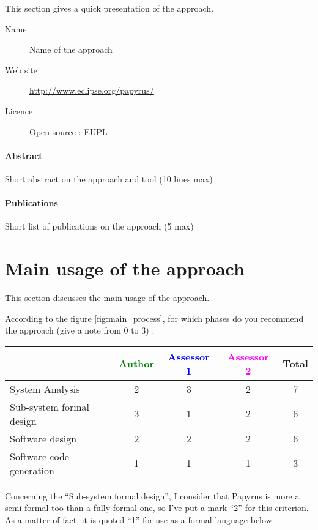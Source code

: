 This section gives a quick presentation of the approach.

\begin{description}
\item[Name] Name of the approach
\item[Web site] \url{http://www.eclipse.org/papyrus/}
\item[Licence] Open source : EUPL
\end{description}

\paragraph{Abstract} Short abstract on the approach and tool (10 lines max)

\paragraph{Publications} Short list of publications on the approach (5 max)


\section{Main usage of the approach}
\label{main_usage}
This section discusses the main usage of the approach.

According to the figure \ref{fig:main_process}, for which phases do you recommend the approach (give a note from 0 to 3) :

\begin{tabular}{|l | c | c | c | c|}
\hline
& \textcolor{green}{Author} & \textcolor{blue}{Assessor 1} & \textcolor{magenta}{Assessor 2} & Total \\
\hline
System Analysis & 2 & 3 & 2 & 7 \\
\hline
Sub-system formal design & 3 & 1 & 2 & 6 \\
\hline
Software design & 2 & 2 & 2 & 6 \\
\hline
Software code generation & 1 & 1 & 1 & 3 \\
\hline
\end{tabular}

\begin{assessor1}
Concerning the "`Sub-system formal design"', I consider that Papyrus is more a semi-formal too than a fully formal one, so I've put a mark "`2"' for this criterion. 
As a matter of fact, it is quoted "`1"' for use as a formal language below. 
\end{assessor1}

